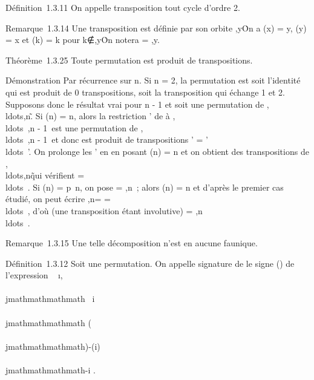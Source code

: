 Définition~1.3.11 On appelle transposition tout cycle d'ordre 2.

Remarque~1.3.14 Une transposition est définie par son orbite
\x,y\. On a \sigma(x) = y, \sigma(y) = x et \sigma(k)
= k pour
k∉\x,y\. On
notera \sigma = \taux,y.

Théorème~1.3.25 Toute permutation est produit de transpositions.

Démonstration Par récurrence sur n. Si n = 2, la permutation est soit
l'identité qui est produit de 0 transpositions, soit la transposition
qui échange 1 et 2. Supposons donc le résultat vrai pour n - 1 et soit \sigma
une permutation de
\1,\\ldots,n\~.
Si \sigma(n) = n, alors la restriction \sigma' de \sigma à
\1,\\ldots~,n
- 1\ est une permutation de
\1,\\ldots~,n
- 1\, et donc est produit de transpositions \sigma' =
'\\ldots\tauk~'.
On prolonge les \taui' en \taui en posant \taui(n)
= n et on obtient des transpositions de
\1,\\ldots,n\~
qui vérifient \sigma =
\\ldots\tauk~.
Si \sigma(n) = p\neq~n, on pose  =
\taup,n\sigma~; alors (n) = n et d'après le premier cas
étudié, on peut écrire \taup,n\sigma =  =
\\ldots\tauk~,
d'où (une transposition étant involutive) \sigma =
\taup,n\\ldots\tauk~.

Remarque~1.3.15 Une telle décomposition n'est en aucune
fa\ccon unique.

Définition~1.3.12 Soit \sigma une permutation. On appelle signature de \sigma le
signe \epsilon(\sigma) de l'expression
\∏  ~
\i,\\\\jmathmathmathmath\ \atop
i\neq~\\\\jmathmathmathmath  \sigma(\\\\jmathmathmathmath)-\sigma(i) \over
\\\\jmathmathmathmath-i .

